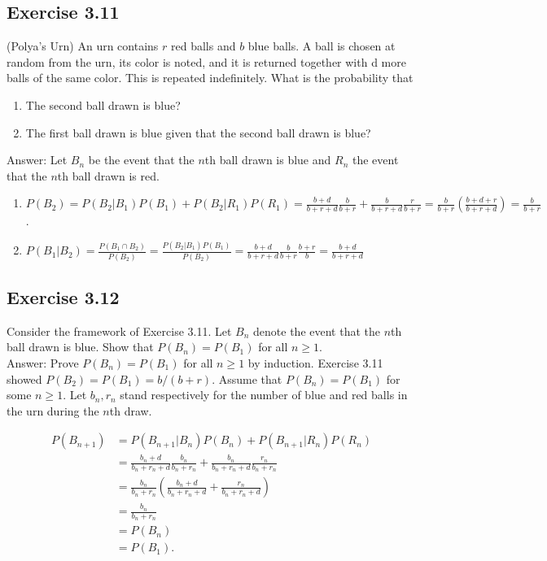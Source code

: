 \documentclass{article}
\begin{document}
\subsection*{Exercise 3.11}

(Polya’s Urn) An urn contains $r$ red balls and $b$ blue balls. A ball is chosen at random from the urn, its color is noted, and it is returned together with d more balls of the same color. This is repeated indefinitely. What is
the probability that

\begin{enumerate}
\item The second ball drawn is blue?

\item The first ball drawn is blue given that the second ball drawn is blue?

\end{enumerate}

Answer: Let $B_n$ be the event that the $n$th ball drawn is blue and $R_n$ the event that the $n$th ball drawn is red.

\begin{enumerate}
\item $P(B_2) = P(B_2 \vert B_1)P(B_1) + P(B_2 \vert R_1)P(R_1) = \frac{b+d}{b+r+d}\frac{b}{b+r} + \frac{b}{b+r+d}\frac{r}{b+r} = \frac{b}{b+r}\left(\frac{b+d+r}{b+r+d}\right) = \frac{b}{b+r}$.

\item
$
P(B_1 \vert B_2) = \frac{P(B_1 \cap B_2)}{P(B_2)}
= \frac{P(B_2 \vert B_1)P(B_1)}{P(B_2)}
= \frac{b+d}{b+r+d}\frac{b}{b+r}\frac{b+r}{b}
= \frac{b+d}{b+r+d}
$
\end{enumerate}

\subsection*{Exercise 3.12}

Consider the framework of Exercise 3.11. Let $B_n$ denote the event that the $n$th ball drawn is blue. Show that $P(B_n) = P(B_1)$ for all $n \geq 1$. \\

Answer: Prove $P(B_n) = P(B_1)$ for all $n\geq 1$ by induction. Exercise 3.11 showed $P(B_2) = P(B_1) = b/(b+r)$. Assume that $P(B_n) = P(B_1)$ for some $n \geq 1$. Let $b_n, r_n$ stand respectively for the number of blue and red balls in the urn during the $n$th draw.

\begin{align*}
P(B_{n+1}) &= P(B_{n+1} \vert B_n)P(B_n) + P(B_{n+1} \vert R_n) P(R_n) \\
&= \frac{b_n + d}{b_n + r_n + d}\frac{b_n}{b_n + r_n} + \frac{b_n}{b_n + r_n + d}\frac{r_n}{b_n + r_n} \\
&= \frac{b_n}{b_n + r_n}\left(\frac{b_n + d}{b_n +r_n + d} + \frac{r_n}{b_n +r_n + d}\right) \\
&= \frac{b_n}{b_n + r_n} \\
&= P(B_n) \\
&= P(B_1).
\end{align*}
\end{document}
